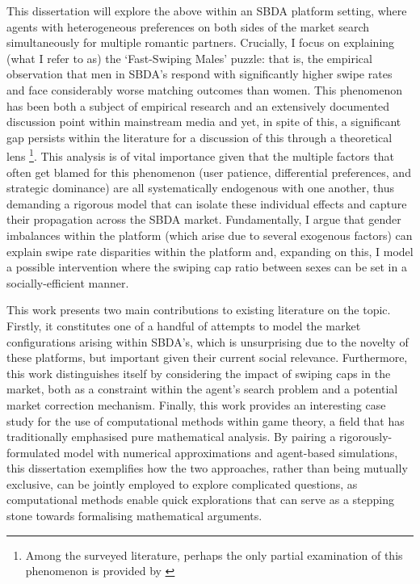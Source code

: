 This dissertation will explore the above within an SBDA platform setting, where agents with heterogeneous preferences on both sides of the market search simultaneously for multiple romantic partners.
Crucially, I focus on explaining (what I refer to as) the `Fast-Swiping Males' puzzle: that is, the empirical observation that men in SBDA's respond with significantly higher swipe rates and face considerably worse matching outcomes than women. This phenomenon has been both a subject of empirical research \citep{tyson2016first} and an extensively documented discussion point within mainstream media \citep{web:vice_tindermen, web:wp_miserabletinder} and yet, in spite of this, a significant gap persists within the literature for a discussion of this through a theoretical lens \footnote{Among the surveyed literature, perhaps the only partial examination of this phenomenon is provided by \cite{kanoria2021facilitating}}. 
This analysis is of vital importance given that the multiple factors that often get blamed for this phenomenon (user patience, differential preferences, and strategic dominance) are all systematically endogenous with one another, thus demanding a rigorous model that can isolate these individual effects and capture their propagation across the SBDA market.
Fundamentally, I argue that gender imbalances within the platform (which arise due to several exogenous factors) can explain swipe rate disparities within the platform and, expanding on this, I model a possible intervention where the swiping cap ratio between sexes can be set in a socially-efficient manner.

This work presents two main contributions to existing literature on the topic. 
Firstly, it constitutes one of a handful of attempts to model the market configurations arising within SBDA's, which is unsurprising due to the novelty of these platforms, but important given their current social relevance. 
Furthermore, this work distinguishes itself by considering the impact of swiping caps in the market, both as a constraint within the agent's search problem and a potential market correction mechanism.
Finally, this work provides an interesting case study for the use of computational methods within game theory, a field that has traditionally emphasised pure mathematical analysis. 
By pairing a rigorously-formulated model with numerical approximations and agent-based simulations, this dissertation exemplifies how the two approaches, rather than being mutually exclusive, can be jointly employed to explore complicated questions, as computational methods enable quick explorations that can serve as a stepping stone towards formalising mathematical arguments.

